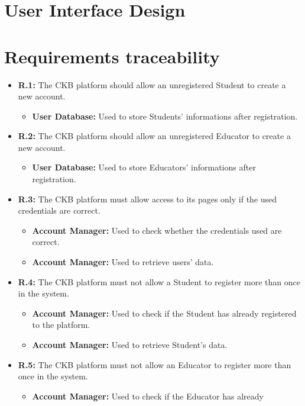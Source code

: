 \documentclass{article}
\begin{document}
{\section{User Interface Design}
\section{Requirements traceability}
\begin{itemize}
    \item \textbf{R.1:} The CKB platform should allow an
        unregistered Student to create a new account.
        \begin{itemize}
            \item \textbf{User Database:} Used to store Students' informations after registration.
        \end{itemize}
    \item \textbf{R.2:} The CKB platform should allow an
        unregistered Educator to create a new account.
        \begin{itemize}
            \item \textbf{User Database:} Used to store Educators' informations after registration.
        \end{itemize}
    \item \textbf{R.3:} The CKB platform must allow access to its pages only if the used credentials are correct.
        \begin{itemize}
            \item \textbf{Account Manager:} Used to check whether the credentials used are correct.
            \item \textbf{Account Manager:} Used to retrieve users' data.
        \end{itemize}
    \item \textbf{R.4:} The CKB platform must not allow a Student to register more than once in the system.
          \begin{itemize}
              \item \textbf{Account Manager:} Used to check if the Student has 
              already registered to the platform.
              \item \textbf{Account Manager:} Used to retrieve Student's data.
          \end{itemize}
    \item \textbf{R.5:} The CKB platform must not allow an Educator to register more than once in the system.
          \begin{itemize}
              \item \textbf{Account Manager:} Used to check if the Educator has already

\end{itemize}
\end{itemize}}
\end{document}
